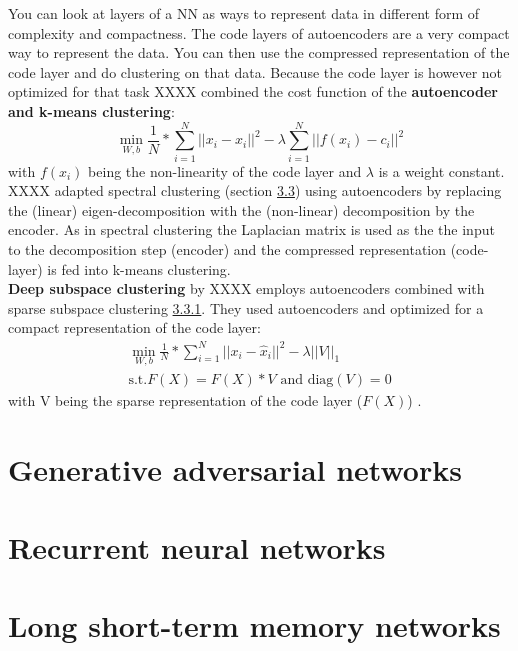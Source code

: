 \documentclass[
]{book}
\begin{document}
You can look at layers of a NN as ways to represent data in different
form of complexity and compactness. The code layers of autoencoders are
a very compact way to represent the data. You can then use the
compressed representation of the code layer and do clustering on that
data. Because the code layer is however not optimized for that task XXXX
combined the cost function of the \textbf{autoencoder and k-means
clustering}:
\[\min_{W,b} \frac{1}{N}*\sum_{i=1}^N ||x_i - \hat{x}_i||^2 - \lambda \sum_{i=1}^N ||f(x_i) - c_i||^2\]
with \(f(x_i)\) being the non-linearity of the code layer and \(\lambda\) is
a weight constant.\\
XXXX adapted spectral clustering (section
\protect\hyperlink{Spectralux5cux2520Clustering}{3.3}) using autoencoders by replacing the
(linear) eigen-decomposition with the (non-linear) decomposition by the
encoder. As in spectral clustering the Laplacian matrix is used as the
the input to the decomposition step (encoder) and the compressed
representation (code-layer) is fed into k-means clustering.\\
\textbf{Deep subspace clustering} by XXXX employs autoencoders combined with
sparse subspace clustering \protect\hyperlink{SSP}{3.3.1}. They used autoencoders and optimized for a compact
representation of the code layer: \[\begin{split}
                \min_{W,b} \frac{1}{N}*\sum_{i=1}^N ||x_i - \hat{x}_i||^2 - \lambda ||V||_1 \\
                \text{s.t.} F(X) = F(X)*V \text{ and diag}(V)=0
            \end{split}\] with V being the sparse representation of the
code layer (\(F(X)\)) .

\hypertarget{generative-adversarial-networks}{%
\section{Generative adversarial networks}\label{generative-adversarial-networks}}

\hypertarget{recurrent-neural-networks}{%
\section{Recurrent neural networks}\label{recurrent-neural-networks}}

\hypertarget{long-short-term-memory-networks}{%
\section{Long short-term memory networks}\label{long-short-term-memory-networks}}
\end{document}
